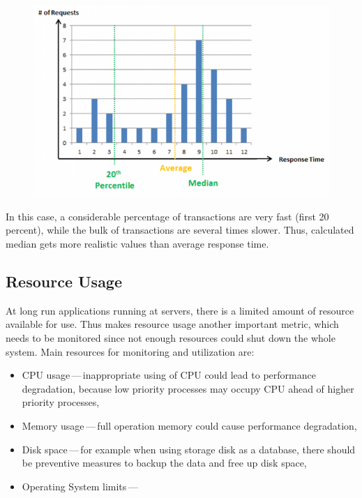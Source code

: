 \begin{figure}[H]
  \centering
  \includegraphics[width=15cm]{obrazky-figures/average_vs_percentile_2.png}
  \caption{}
  \label{fig:average_percentil_2}
\end{figure}

In this case, a considerable percentage of transactions are very fast (first 20 percent), while the bulk of transactions are several times slower. Thus, calculated median gets more realistic values than average response time.

\subsection{Resource Usage}
At long run applications running at servers, there is a limited amount of resource available for use. Thus makes resource usage another important metric, which needs to be monitored since not enough resources could shut down the whole system. Main resources for monitoring and utilization are:

\begin{itemize}
	\setlength\itemsep{0em}
	\item CPU usage\,---\,inappropriate using of CPU could lead to performance degradation, because low priority processes may occupy CPU ahead of higher priority processes, 
	\item Memory usage\,---\,full operation memory could cause performance degradation,
	\item Disk space\,---\,for example when using storage disk as a database, there should be preventive measures to backup the data and free up disk space,
	\item Operating System limits\,---\,
\end{itemize}


